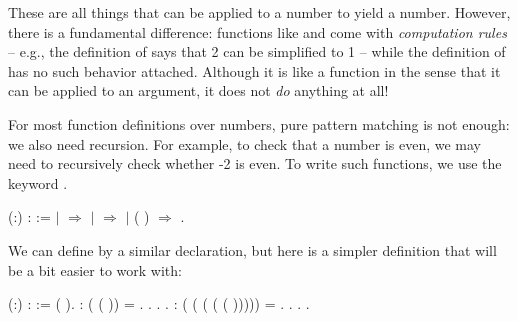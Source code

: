 \documentclass[12pt]{report}
\begin{document}
These are all things that can be applied to a number to yield a
    number.  However, there is a fundamental difference: functions
    like  and  come with \textit{computation rules} -- e.g.,
    the definition of  says that  2 can be simplified to
    1 -- while the definition of  has no such behavior attached.
    Although it is like a function in the sense that it can be applied
    to an argument, it does not \textit{do} anything at all! 

 For most function definitions over numbers, pure pattern
    matching is not enough: we also need recursion.  For example, to
    check that a number  is even, we may need to recursively check
    whether -2 is even.  To write such functions, we use the
    keyword . \begin{coqdoccode}
\coqdocemptyline
\coqdocnoindent
{}  (:) :  :=\coqdoceol
\coqdocindent{1.00em}
  \coqdoceol
\coqdocindent{1.00em}
\ensuremath{|}         \ensuremath{\Rightarrow} \coqdoceol
\coqdocindent{1.00em}
\ensuremath{|}        \ensuremath{\Rightarrow} \coqdoceol
\coqdocindent{1.00em}
\ensuremath{|}  ( ) \ensuremath{\Rightarrow}  \coqdoceol
\coqdocindent{1.00em}
.\coqdoceol
\coqdocemptyline
\end{coqdoccode}
We can define  by a similar  declaration, but here
    is a simpler definition that will be a bit easier to work with: \begin{coqdoccode}
\coqdocemptyline
\coqdocnoindent
{}  (:) :    :=    ( ).\coqdoceol
\coqdocemptyline
\coqdocnoindent
{} :    ( ( )) = .\coqdoceol
\coqdocnoindent
{}. . .\coqdoceol
\coqdocnoindent
{} :    ( ( ( ( ( ))))) = .\coqdoceol
\coqdocnoindent
{}. . .\coqdoceol
\coqdocemptyline
\end{coqdoccode}
\end{document}
